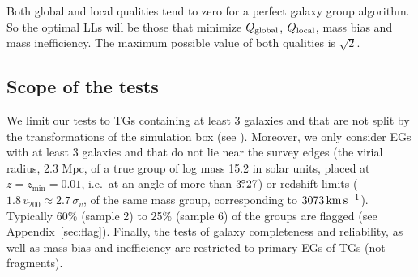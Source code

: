 Both global and local qualities tend to zero for a perfect galaxy group
algorithm. So the optimal LLs will be those that minimize $Q_{\rm global}$,
$Q_{\rm local}$, mass bias and mass inefficiency. The maximum possible value of
both qualities is $\sqrt{2}$.

\subsection{Scope of the tests}

We limit our tests to TGs containing at least 3 galaxies and that are not split
by the transformations of the simulation box (see ).
Moreover, we only consider EGs with at least 3 galaxies and that do not lie
near the survey edges (the virial radius, 2.3 Mpc, of a true group of log mass
15.2 in solar units, placed at $z=z_{\min}=0.01$, i.e.\ at an angle of
more than $3\hbox{$.\!\!^\circ$}27$) or redshift limits ($1.8\,v_{200} \approx 2.7 \,\sigma_v$,
of the same mass group, corresponding to $3073 \, \rm km \, s^{-1}$). Typically
60\% (sample 2) to 25\% (sample 6) of the groups are flagged (see
Appendix~\ref{sec:flag}). Finally, the tests of galaxy completeness and
reliability, as well as mass bias and inefficiency are restricted to primary
EGs of TGs (not fragments).

